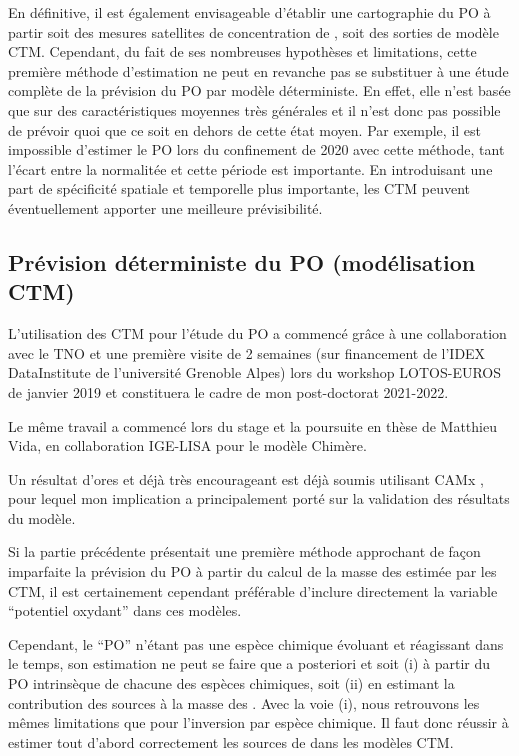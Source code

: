 \bigskip

En définitive, il est également envisageable d'établir une cartographie du PO à partir
soit des mesures satellites de concentration de \PMdix, soit des sorties de modèle CTM.
Cependant, du fait de ses nombreuses hypothèses et limitations, cette première méthode
d'estimation ne peut en revanche pas se substituer à une étude complète de la prévision du
PO par modèle déterministe.
En effet, elle n'est basée que sur des caractéristiques moyennes très générales et il
n'est donc pas possible de prévoir quoi que ce soit en dehors de cette état moyen. Par
exemple, il est impossible d'estimer le PO lors du confinement de 2020 avec cette
méthode, tant l'écart entre la normalitée et cette période est importante.
En introduisant une part de spécificité spatiale et temporelle plus importante, les CTM
peuvent éventuellement apporter une meilleure prévisibilité.

\subsection{Prévision déterministe du PO (modélisation CTM)}

\begin{tcolorbox}[colback=red!5!white,colframe=Melon,title=Note]
    L'utilisation des CTM pour l'étude du PO a commencé grâce à une collaboration avec le
    TNO et une première visite de 2 semaines (sur financement de l'IDEX DataInstitute de l'université Grenoble Alpes) lors du
    workshop LOTOS-EUROS de janvier 2019 et constituera le cadre de mon post-doctorat 2021-2022.

    Le même travail a commencé lors du stage et la poursuite en thèse de Matthieu Vida, en
    collaboration IGE-LISA pour le modèle Chimère.

    Un résultat d'ores et déjà très encourageant est déjà soumis utilisant CAMx
    \parencite{daellenbachSourcessubmitted}, pour lequel mon implication a principalement
    porté sur la validation des résultats du modèle.
\end{tcolorbox}

Si la partie précédente présentait une première méthode approchant de façon imparfaite la prévision du PO à partir
du calcul de la masse des \PMdix{} estimée par les CTM, il est certainement cependant
préférable d'inclure directement la variable ``potentiel oxydant'' dans ces modèles.

Cependant, le ``PO'' n'étant pas une espèce chimique évoluant et réagissant dans le temps, son
estimation ne peut se faire que a posteriori et soit (i) à partir du PO intrinsèque de chacune
des espèces chimiques, soit (ii) en estimant la contribution des sources à la masse des \PMdix.
Avec la voie (i), nous retrouvons les mêmes limitations que pour l'inversion par espèce chimique. Il faut donc
réussir à estimer tout d'abord correctement les sources de \PMdix{} dans les modèles CTM.

